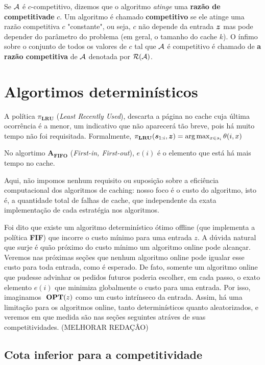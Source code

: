 Se \(\mathcal{A}\) é \(c\)-competitivo, dizemos que o algoritmo \emph{atinge} uma \textbf{razão de competitivade} \(c\). Um algoritmo é chamado \textbf{competitivo} se ele atinge uma razão competitiva \(c\) "constante", ou seja, \(c\) não depende da entrada \(\bm{z}\) mas pode depender do parâmetro do problema (em geral, o tamanho do cache \(k\)). O ínfimo sobre o conjunto de todos os valores de \(c\) tal que \(\mathcal{A}\) é competitivo é chamado de \textbf{a razão competitiva} de \(\mathcal{A}\) denotada por \(\mathcal{R}(\mathcal{A})\).

\section{Algortimos determinísticos}

A política \(\pi_{\mathbf{LRU}}\) (\textit{Least Recently Used}), descarta a página no cache cuja última ocorrência é a menor, um indicativo que não aparecerá tão breve, pois há muito tempo não foi requisitada. Formalmente, \( \pi_{\mathbf{LRU}} (\bm{s}_{1:i}, \bm{z}) = \arg {\max_{x \in s_i} \theta(i, x)}\)

No algortimo \(\mathbf{A_{FIFO}}\) (\textit{First-in, First-out}), \(e(i)\) é o elemento que está há mais tempo no cache. 

Aqui, não impomos nenhum requisito ou suposição sobre a eficiência computacional dos algoritmos de caching: nosso foco é o custo do algoritmo, isto é, a quantidade total de falhas de cache, que independente da exata implementação de cada estratégia nos algoritmos.

Foi dito que existe um algoritmo determinístico ótimo offline (que implementa a política \textbf{FIF}) que incorre o custo mínimo para uma entrada \(z\). A dúvida natural que surje é quão próximo do custo mínimo um algoritmo online pode alcançar. Veremos nas próximas seções que nenhum algoritmo online pode igualar esse custo para toda entrada, como é esperado. De fato, somente um algoritmo online que pudesse advinhar os pedidos futuros poderia escolher, em cada passo, o exato elemento \(e(i)\) que minimiza globalmente o custo para uma entrada. Por isso, imaginamos \(\ \textbf{OPT}(z)\) como um custo intrínseco da entrada. Assim, há uma limitação para os algoritmos online, tanto determinísticos quanto aleatorizados, e veremos em que medida são nas seções seguintes atráves de suas competitividades. (MELHORAR REDAÇÂO)

\subsection{Cota inferior para a competitividade}

